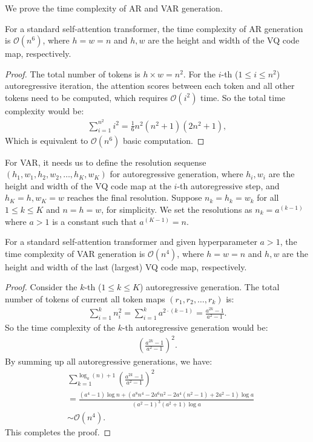 We prove the time complexity of AR and VAR generation.
\begin{lemma}
For a standard self-attention transformer, the time complexity of AR generation is $\mathcal{O}(n^6)$, where $h=w=n$ and $h, w$ are the height and width of the VQ code map, respectively.
\end{lemma}
\begin{proof}
The total number of tokens is $h\times w=n^2$.
For the $i$-th ($1 \le i \le n^2$) autoregressive iteration, the attention scores between each token and all other tokens need to be computed, which requires $\mathcal{O}(i^2)$ time.
So the total time complexity would be:
\begin{align}
	\sum\limits_{i=1}^{n^2} i^2 = \frac{1}{6}n^2(n^2+1)(2n^2+1),
\end{align}
Which is equivalent to $\mathcal{O}(n^6)$ basic computation.
\end{proof}

\noindent For VAR, it needs us to define the resolution sequense $(h_1, w_1, h_2, w_2, \dots, h_K, w_K)$ for autoregressive generation, where $h_i, w_i$ are the height and width of the VQ code map at the $i$-th autoregressive step, and $h_K=h, w_K=w$ reaches the final resolution.
Suppose $n_k = h_k = w_k$ for all $1\le k\le K$ and $n=h=w$, for simplicity.
We set the resolutions as $n_k=a^{(k-1)}$ where $a>1$ is a constant such that $a^{(K-1)}=n$.
\begin{lemma}
For a standard self-attention transformer and given hyperparameter $a>1$, the time complexity of VAR generation is $\mathcal{O}(n^4)$, where $h=w=n$ and $h, w$ are the height and width of the last (largest) VQ code map, respectively.
\end{lemma}
\begin{proof}
Consider the $k$-th ($1 \le k \le K$) autoregressive generation.
The total number of tokens of current all token maps $(r_1, r_2, \dots, r_k)$ is:
\begin{align}
\sum\limits_{i=1}^{k} n_i^2 = \sum\limits_{i=1}^{k} a^{2\cdot(k-1)} = \frac{a^{2k}-1}{a^2-1}.
\end{align}
So the time complexity of the $k$-th autoregressive generation would be:
\begin{align}
	\left(\frac{a^{2k}-1}{a^2-1}\right) ^ 2.
\end{align}
By summing up all autoregressive generations, we have:
\begin{align}
	& \sum\limits_{k=1}^{\log_a(n)+1} \left(\frac{a^{2k}-1}{a^2-1}\right) ^ 2 \\
	&= \frac{(a^4-1)\log n + \left( a^8n^4 - 2a^6n^2 - 2a^4(n^2-1) + 2 a^2 - 1 \right)\log a}{(a^2-1)^3(a^2+1)\log a} \\
	&\sim \mathcal{O}(n^4).
\end{align}
This completes the proof.
\end{proof}



